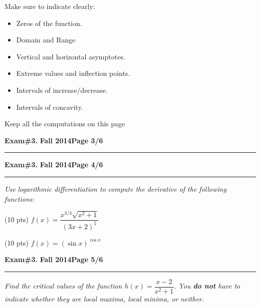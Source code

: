 \documentclass[12pt]{article}
\begin{document}
Make sure to indicate clearly:
\begin{itemize}
\item Zeros of the function.
\item Domain and Range
\item Vertical and horizontal asymptotes.
\item Extreme values and inflection points.
\item Intervals of increase/decrease.
\item Intervals of concavity.
\end{itemize}

Keep all the computations on this page
\newpage

\hfill{\large\bf Exam\#3.}\hfill{\large\bf
  Fall 2014}\hfill{\large\bf Page 3/6}\hrule

\newpage 

\hfill{\large\bf Exam\#3.}\hfill{\large\bf
  Fall 2014}\hfill{\large\bf Page 4/6}\hrule

\bigskip
{\problem \em Use logarithmic differentiation to compute the derivative of the following functions:}

\vspace{0.5cm}
\noindent (10 pts)
$f(x) = \dfrac{x^{3/4} \sqrt{x^2 + 1}}{(3x + 2)^5}$

\vspace{8cm}
\begin{flushright}
\end{flushright}

\noindent (10 pts) 
$f(x) = (\sin x)^{\cos x}$

\vspace{8cm}
\begin{flushright}
\end{flushright}

\newpage

\hfill{\large\bf Exam\#3.}\hfill{\large\bf
  Fall 2014}\hfill{\large\bf Page 5/6}\hrule

\bigskip
{\problem[10 pts] \em Find the critical values of the function $h(x)=\dfrac{x-2}{x^2+1}$.  You \textbf{do not} have to indicate whether they are local maxima, local minima, or neither.}
\end{document}
